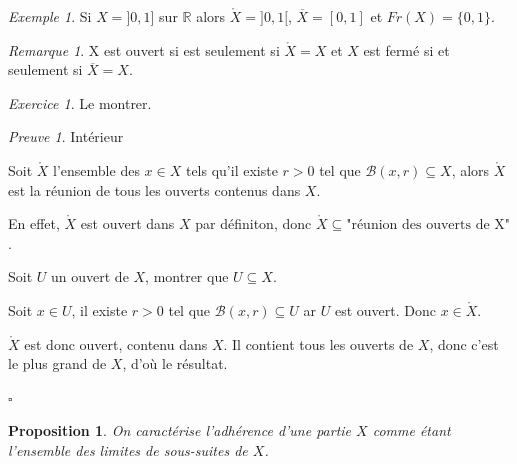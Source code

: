\documentclass[]{article}
\newtheorem{myproposition}{Proposition}
\theoremstyle{remark}
\newtheorem{myrem}{Remarque}
\newtheorem{myexer}{Exercice}
\newtheorem{myproof}{Preuve}
\newtheorem{myexmpl}{Exemple}
\theoremstyle{definition}
\newcommand{\cqfd}{
	\hfill$\square$
}
\begin{document}
\begin{myexmpl}
	Si $X = ]0, 1]$ sur $\mathbb{R}$ alors $\mathring{X} = ]0, 1[$, $\overline{X}=[0, 1]$ et $Fr(X)=\{0, 1\}$.
\end{myexmpl}

\begin{myrem}
	X est ouvert si est seulement si $\mathring{X} = X$ et $X$ est fermé si et seulement si $\overline{X}=X$.
\end{myrem}

\begin{myexer}
	Le montrer.
\end{myexer}

\begin{myproof}Intérieur
	
	Soit $\mathring{X}$ l'ensemble des $x \in X$ tels qu'il existe $r > 0$ tel que $\mathcal{B}(x, r) \subseteq X$, alors $\mathring{X}$ est la réunion de tous les ouverts contenus dans $X$.
	
	En effet, $\mathring{X}$ est ouvert dans $X$ par définiton, donc $\mathring{X} \subseteq \text{"réunion des ouverts de X"}$.
	
	Soit $U$ un ouvert de $X$, montrer que $U \subseteq X$.
	
	Soit $x \in U$, il existe $r>0$ tel que $\mathcal{B}(x, r) \subseteq U$ ar $U$ est ouvert. Donc $x \in \mathring{X}$.
	
	$\mathring{X}$ est donc ouvert, contenu dans $X$. Il contient tous les ouverts de $X$, donc c'est le plus grand de $X$, d'où le résultat.
	\cqfd
\end{myproof}

\begin{myproposition}
	On caractérise l'adhérence d'une partie $X$ comme étant l'ensemble des limites de sous-suites de $X$.
\end{myproposition}
\end{document}
